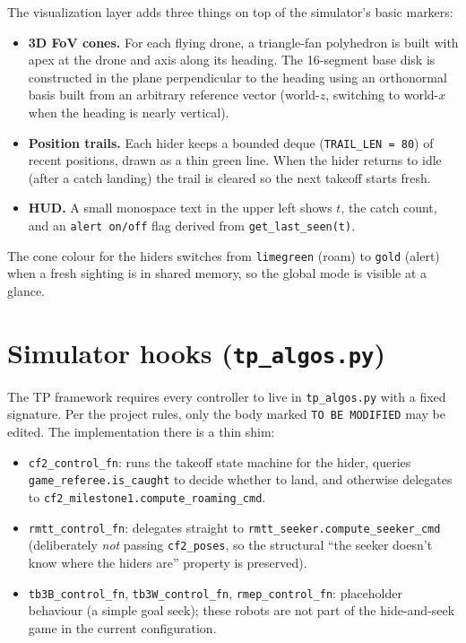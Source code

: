 \documentclass[11pt,a4paper]{article}
\newcommand{\code}[1]{\texttt{#1}}
\begin{document}
The visualization layer adds three things on top of the simulator's basic
markers:
\begin{itemize}[leftmargin=1.4em]
  \item \textbf{3D FoV cones.} For each flying drone, a triangle-fan
        polyhedron is built with apex at the drone and axis along its
        heading. The 16-segment base disk is constructed in the plane
        perpendicular to the heading using an orthonormal basis built from
        an arbitrary reference vector (world-$z$, switching to world-$x$
        when the heading is nearly vertical).
  \item \textbf{Position trails.} Each hider keeps a bounded deque
        (\code{TRAIL\_LEN = 80}) of recent positions, drawn as a thin green
        line. When the hider returns to idle (after a catch landing) the
        trail is cleared so the next takeoff starts fresh.
  \item \textbf{HUD.} A small monospace text in the upper left shows
        $t$, the catch count, and an \code{alert on/off} flag derived from
        \code{get\_last\_seen(t)}.
\end{itemize}
The cone colour for the hiders switches from \code{limegreen} (roam) to
\code{gold} (alert) when a fresh sighting is in shared memory, so the global
mode is visible at a glance.

\section{Simulator hooks (\code{tp\_algos.py})}

The TP framework requires every controller to live in \code{tp\_algos.py} with
a fixed signature. Per the project rules, only the body marked
\code{TO BE MODIFIED} may be edited. The implementation there is a thin shim:
\begin{itemize}[leftmargin=1.4em]
  \item \code{cf2\_control\_fn}: runs the takeoff state machine for the
        hider, queries \code{game\_referee.is\_caught} to decide whether to
        land, and otherwise delegates to
        \code{cf2\_milestone1.compute\_roaming\_cmd}.
  \item \code{rmtt\_control\_fn}: delegates straight to
        \code{rmtt\_seeker.compute\_seeker\_cmd} (deliberately \emph{not}
        passing \code{cf2\_poses}, so the structural ``the seeker doesn't
        know where the hiders are'' property is preserved).
  \item \code{tb3B\_control\_fn}, \code{tb3W\_control\_fn},
        \code{rmep\_control\_fn}: placeholder behaviour (a simple goal seek);
        these robots are not part of the hide-and-seek game in the current
        configuration.
\end{itemize}
\end{document}
